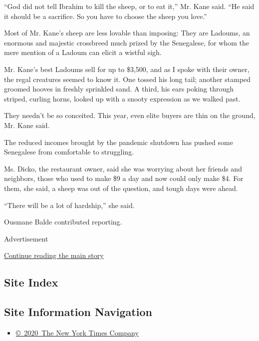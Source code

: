 ``God did not tell Ibrahim to kill the sheep, or to eat it,'' Mr. Kane
said. ``He said it should be a sacrifice. So you have to choose the
sheep you love.''

Most of Mr. Kane's sheep are less lovable than imposing: They are
Ladoums, an enormous and majestic crossbreed much prized by the
Senegalese, for whom the mere mention of a Ladoum can elicit a wistful
sigh.

Mr. Kane's best Ladoums sell for up to \$3,500, and as I spoke with
their owner, the regal creatures seemed to know it. One tossed his long
tail; another stamped groomed hooves in freshly sprinkled sand. A third,
his ears poking through striped, curling horns, looked up with a snooty
expression as we walked past.

They needn't be so conceited. This year, even elite buyers are thin on
the ground, Mr. Kane said.

The reduced incomes brought by the pandemic shutdown has pushed some
Senegalese from comfortable to struggling.

Ms. Dicko, the restaurant owner, said she was worrying about her friends
and neighbors, those who used to make \$9 a day and now could only make
\$4. For them, she said, a sheep was out of the question, and tough days
were ahead.

``There will be a lot of hardship,'' she said.

Ousmane Balde contributed reporting.

Advertisement

\protect\hyperlink{after-bottom}{Continue reading the main story}

\hypertarget{site-index}{%
\subsection{Site Index}\label{site-index}}

\hypertarget{site-information-navigation}{%
\subsection{Site Information
Navigation}\label{site-information-navigation}}

\begin{itemize}
\tightlist
\item
  \href{https://help.nytimes.com/hc/en-us/articles/115014792127-Copyright-notice}{©~2020~The
  New York Times Company}
\end{itemize}

